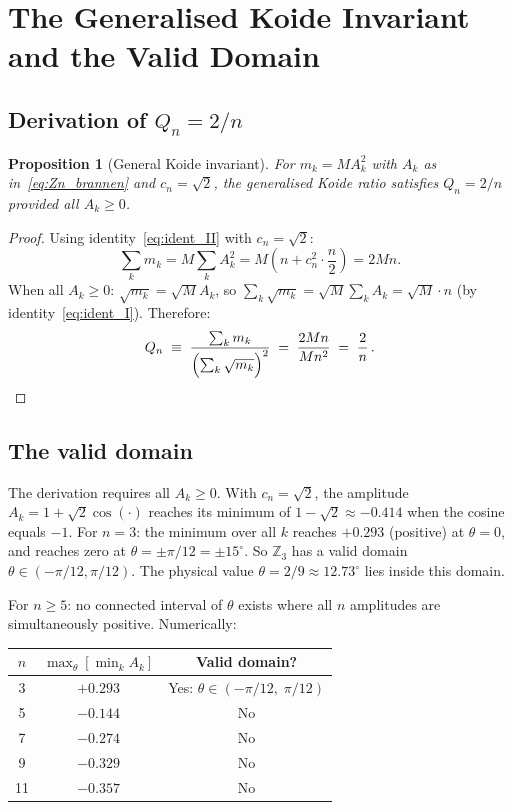 \documentclass[11pt]{article}
\newtheorem{proposition}{Proposition}
\begin{document}
\section{The Generalised Koide Invariant and the Valid Domain}
\label{sec:koide_general}

\subsection{Derivation of $Q_n = 2/n$}

\begin{proposition}[General Koide invariant]
  \label{prop:Qn}
  For $m_k = M A_k^2$ with $A_k$ as in~\eqref{eq:Zn_brannen} and $c_n = \sqrt{2}$,
  the generalised Koide ratio satisfies $Q_n = 2/n$ provided all $A_k \geq 0$.
\end{proposition}

\begin{proof}
Using identity~\eqref{eq:ident_II} with $c_n = \sqrt{2}$:
\[
  \sum_k m_k = M \sum_k A_k^2 = M\!\left(n + c_n^2 \cdot \frac{n}{2}\right) = 2Mn.
\]
When all $A_k \geq 0$: $\sqrt{m_k} = \sqrt{M} A_k$, so
$\sum_k \sqrt{m_k} = \sqrt{M}\sum_k A_k = \sqrt{M}\cdot n$ (by identity~\eqref{eq:ident_I}).
Therefore:
\[
  Q_n \;\equiv\; \frac{\sum_k m_k}{\Bigl(\sum_k \sqrt{m_k}\Bigr)^2}
  \;=\; \frac{2Mn}{M n^2} \;=\; \frac{2}{n}\,.
\]
\end{proof}

\subsection{The valid domain}

The derivation requires all $A_k \geq 0$.
With $c_n = \sqrt{2}$, the amplitude $A_k = 1 + \sqrt{2}\cos(\cdot)$
reaches its minimum of $1 - \sqrt{2} \approx -0.414$ when the cosine
equals $-1$.
For $n = 3$: the minimum over all $k$ reaches $+0.293$ (positive) at
$\theta = 0$, and reaches zero at $\theta = \pm\pi/12 = \pm 15^\circ$.
So $\mathbb{Z}_3$ has a valid domain $\theta \in (-\pi/12, \pi/12)$.
The physical value $\theta = 2/9 \approx 12.73^\circ$ lies inside this domain.

For $n \geq 5$: no connected interval of $\theta$ exists where all $n$
amplitudes are simultaneously positive.
Numerically:
\begin{center}
\begin{tabular}{ccc}
\toprule
$n$ & $\max_\theta[\min_k A_k]$ & Valid domain? \\
\midrule
3  & $+0.293$ & Yes: $\theta \in (-\pi/12,\; \pi/12)$ \\
5  & $-0.144$ & No \\
7  & $-0.274$ & No \\
9  & $-0.329$ & No \\
11 & $-0.357$ & No \\
\bottomrule
\end{tabular}
\end{center}
\end{document}
